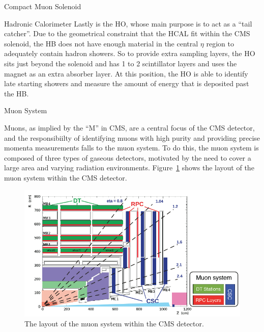 \begin{section}{Compact Muon Solenoid}
\begin{subsection}{Hadronic Calorimeter}
Lastly is the HO, whose main purpose is to act as a ``tail catcher''. 
Due to the geometrical constraint that the HCAL fit within the CMS solenoid, the HB does not have enough material in the central $\eta$ region to adequately contain hadron showers.
So to provide extra sampling layers, the HO sits just beyond the solenoid and has 1 to 2 scintillator layers and uses the magnet as an extra absorber layer. 
At this position, the HO is able to identify late starting showers and measure the amount of energy that is deposited past the HB.

\end{subsection}

\begin{subsection}{Muon System}

Muons, as implied by the ``M'' in CMS, are a central focus of the CMS detector, and the responsibiilty of identifying muons with high purity and providing precise momenta measurements falls to the muon system.
To do this, the muon system is composed of three types of gaseous detectors, motivated by the need to cover a large area and varying radiation environments.
Figure~\ref{fig:cms_muonsys} shows the layout of the muon system within the CMS detector.

\begin{figure}[tbp!]
\begin{center}
\includegraphics[angle=0,width=0.80\columnwidth]{fig/cms_muonsys.png}
\end{center}
\caption{The layout of the muon system within the CMS detector.~\cite{1748-0221-8-04-P04005}}
\label{fig:cms_muonsys}
\end{figure}


\end{subsection}
\end{section}

